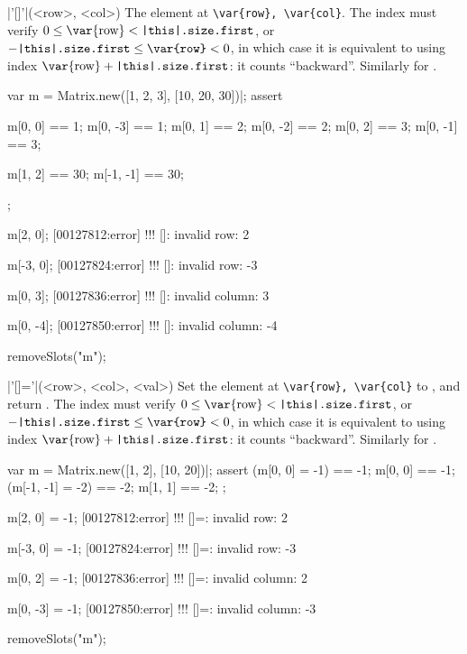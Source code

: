 \begin{urbiscriptapi}
\item|'[]'|(<row>, <col>)%
  The element at \lstinline|\var{row}, \var{col}|.  The index  must
  verify $0 \le \textrm{\var{row}} < \texttt{\this.size.first}$, or
  $-\texttt{\this.size.first} \le \texttt{\var{row}} < 0$, in which case it
  is equivalent to using index $\textrm{\var{row}} +
  \texttt{\this.size.first}$: it counts ``backward''.  Similarly for
  .
\begin{urbiscript}
var m = Matrix.new([1, 2, 3], [10, 20, 30])|;
assert
{
  m[0, 0] == 1;   m[0, -3] == 1;
  m[0, 1] == 2;   m[0, -2] == 2;
  m[0, 2] == 3;   m[0, -1] == 3;

  m[1, 2] == 30;  m[-1, -1] == 30;
};

m[2, 0];
[00127812:error] !!! []: invalid row: 2

m[-3, 0];
[00127824:error] !!! []: invalid row: -3

m[0, 3];
[00127836:error] !!! []: invalid column: 3

m[0, -4];
[00127850:error] !!! []: invalid column: -4
\end{urbiscript}
\begin{urbicomment}
  removeSlots("m");
\end{urbicomment}


\item|'[]='|(<row>, <col>, <val>)%
  Set the element at \lstinline|\var{row}, \var{col}| to , and
  return .  The index  must verify $0 \le
  \textrm{\var{row}} < \texttt{\this.size.first}$, or
  $-\texttt{\this.size.first} \le \texttt{\var{row}} < 0$, in which case it
  is equivalent to using index $\textrm{\var{row}} +
  \texttt{\this.size.first}$: it counts ``backward''.  Similarly for
  .
\begin{urbiscript}
var m = Matrix.new([1, 2], [10, 20])|;
assert
{
  (m[0, 0]  = -1) == -1;   m[0, 0] == -1;
  (m[-1, -1] = -2) == -2;  m[1, 1] == -2;
};

m[2, 0] = -1;
[00127812:error] !!! []=: invalid row: 2

m[-3, 0] = -1;
[00127824:error] !!! []=: invalid row: -3

m[0, 2] = -1;
[00127836:error] !!! []=: invalid column: 2

m[0, -3] = -1;
[00127850:error] !!! []=: invalid column: -3
\end{urbiscript}
\begin{urbicomment}
  removeSlots("m");
\end{urbicomment}



\end{urbiscriptapi}
